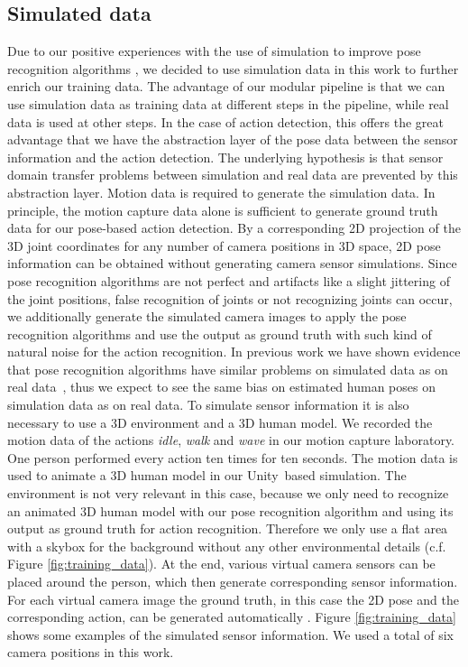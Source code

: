 \documentclass[a4paper, 10pt, conference]{ieeeconf}
\begin{document}
\begin{minipage}{\textwidth}
\subsection{Simulated data}
\label{sec:train_simulated}
Due to our positive experiences with the use of simulation to improve pose recognition algorithms \cite{ludlUsingSimulationImprove2018}, we decided to use simulation data in this work to further enrich our training data. The advantage of our modular pipeline is that we can use simulation data as training data at different steps in the pipeline, while real data is used at other steps. In the case of action detection, this offers the great advantage that we have the abstraction layer of the pose data between the sensor information and the action detection. The underlying hypothesis is that sensor domain transfer problems between simulation and real data are prevented by this abstraction layer. Motion data is required to generate the simulation data. In principle, the motion capture data alone is sufficient to generate ground truth data for our pose-based action detection. By a corresponding 2D projection of the 3D joint coordinates for any number of camera positions in 3D space, 2D pose information can be obtained without generating camera sensor simulations. Since pose recognition algorithms are not perfect and artifacts like a slight jittering of the joint positions, false recognition of joints or not recognizing joints can occur, we additionally generate the simulated camera images to apply the pose recognition algorithms and use the output as ground truth with such kind of natural noise for the action recognition. In previous work we have shown evidence that pose recognition algorithms have similar problems on simulated data as on real data~\cite{ludlUsingSimulationImprove2018}, thus we expect to see the same bias on estimated human poses on simulation data as on real data. To simulate sensor information it is also necessary to use a 3D environment and a 3D human model. We recorded the motion data of the actions \textit{idle}, \textit{walk} and \textit{wave} in our motion capture laboratory. One person performed every action ten times for ten seconds. The motion data is used to animate a 3D human model in our Unity\textregistered~based simulation. The environment is not very relevant in this case, because we only need to recognize an animated 3D human model with our pose recognition algorithm and using its output as ground truth for action recognition. Therefore we only use a flat area with a skybox for the background without any other environmental details (c.f. Figure \ref{fig:training_data}). At the end, various virtual camera sensors can be placed around the person, which then generate corresponding sensor information. For each virtual camera image the ground truth, in this case the 2D pose and the corresponding action, can be generated automatically \cite{ludlUsingSimulationImprove2018}. Figure \ref{fig:training_data} shows some examples of the simulated sensor information. We used a total of six camera positions in this work.


\end{minipage}
\end{document}
